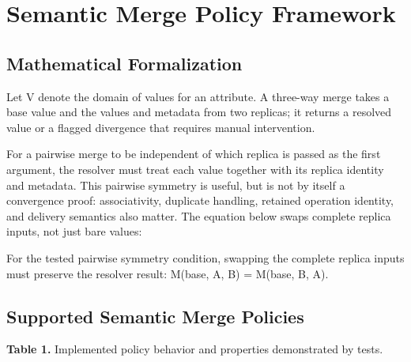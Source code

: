 \documentclass[runningheads]{llncs}
\begin{document}
\section{Semantic Merge Policy Framework}
\subsection{Mathematical Formalization}
Let V denote the domain of values for an attribute. A three-way merge takes a base value and the values and metadata from two replicas; it returns a resolved value or a flagged divergence that requires manual intervention.

For a pairwise merge to be independent of which replica is passed as the first argument, the resolver must treat each value together with its replica identity and metadata. This pairwise symmetry is useful, but is not by itself a convergence proof: associativity, duplicate handling, retained operation identity, and delivery semantics also matter. The equation below swaps complete replica inputs, not just bare values:

For the tested pairwise symmetry condition, swapping the complete replica inputs must preserve the resolver result: M(base, A, B) = M(base, B, A).

\subsection{Supported Semantic Merge Policies}
\textbf{Table 1.} Implemented policy behavior and properties demonstrated by tests.
\end{document}

